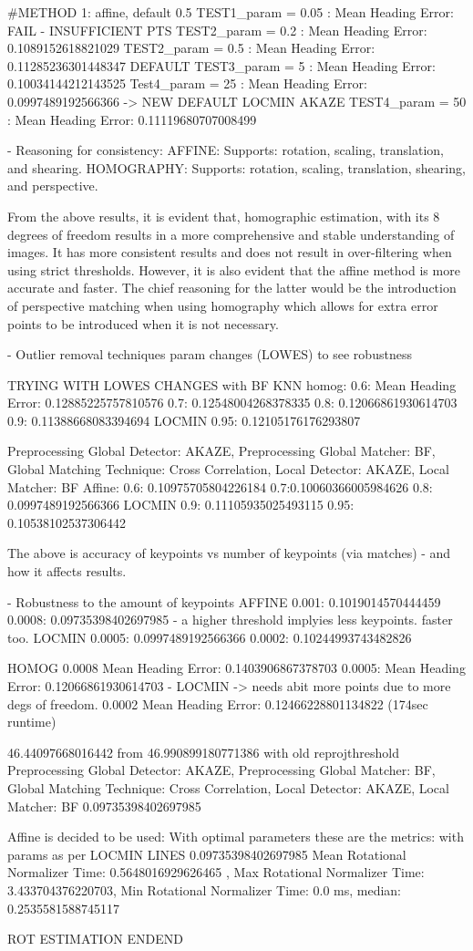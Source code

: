 \#METHOD 1: affine, default 0.5
TEST1\_param = 0.05 : Mean Heading Error: FAIL - INSUFFICIENT PTS
TEST2\_param = 0.2 : Mean Heading Error: 0.1089152618821029
TEST2\_param = 0.5 : Mean Heading Error: 0.11285236301448347 DEFAULT
TEST3\_param = 5 : Mean Heading Error: 0.10034144212143525
Test4\_param = 25 : Mean Heading Error: 0.0997489192566366 -> NEW DEFAULT LOCMIN AKAZE 
TEST4\_param = 50 : Mean Heading Error: 0.11119680707008499

- Reasoning for consistency:
AFFINE: Supports: rotation, scaling, translation, and shearing.
HOMOGRAPHY: Supports: rotation, scaling, translation, shearing, and perspective.

From the above results, it is evident that, homographic estimation, with its 8 degrees of freedom results in a more comprehensive and stable understanding of images. It has more consistent results and does not result in over-filtering when using strict thresholds. However, it is also evident that the affine method is more accurate and faster. The chief reasoning for the latter would be the introduction of perspective matching when using homography which allows for extra error points to be introduced when it is not necessary. 


- Outlier removal techniques param changes (LOWES) to see robustness

TRYING WITH LOWES CHANGES with BF KNN
homog:
0.6: Mean Heading Error: 0.12885225757810576
0.7: 0.12548004268378335    
0.8: 0.12066861930614703
0.9: 0.11388668083394694 LOCMIN
0.95: 0.12105176176293807

Preprocessing Global Detector: AKAZE, Preprocessing Global Matcher: BF, Global Matching Technique: Cross Correlation, Local Detector: AKAZE, Local Matcher: BF
Affine:
0.6: 0.10975705804226184
0.7:0.10060366005984626
0.8: 0.0997489192566366 LOCMIN
0.9: 0.11105935025493115
0.95: 0.10538102537306442

The above is accuracy of keypoints vs number of keypoints (via matches) - and how it affects results. 


- Robustness to the amount of keypoints 
AFFINE
0.001:  0.1019014570444459
0.0008: 0.09735398402697985 -  a higher threshold implyies less keypoints. faster too. LOCMIN
0.0005: 0.0997489192566366
0.0002: 0.10244993743482826


HOMOG
0.0008 Mean Heading Error: 0.1403906867378703
0.0005: Mean Heading Error: 0.12066861930614703 - LOCMIN -> needs abit more points due to more degs of freedom. 
0.0002 Mean Heading Error:  0.12466228801134822 (174sec runtime)



46.44097668016442 from 46.990899180771386 with old reprojthreshold
Preprocessing Global Detector: AKAZE, Preprocessing Global Matcher: BF, Global Matching Technique: Cross Correlation, Local Detector: AKAZE, Local Matcher: BF
0.09735398402697985

Affine is decided to be used:
With optimal parameters these are the metrics: with params as per LOCMIN LINES
0.09735398402697985
Mean Rotational Normalizer Time: 0.5648016929626465 , Max Rotational Normalizer Time: 3.433704376220703, Min Rotational Normalizer Time: 0.0 ms, median: 0.2535581588745117



ROT ESTIMATION ENDEND
